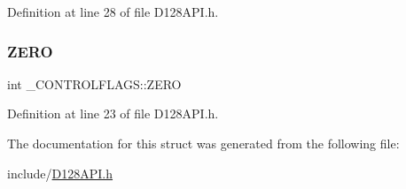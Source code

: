 Definition at line 28 of file D128\+A\+P\+I.\+h.

\mbox{\label{struct___c_o_n_t_r_o_l_f_l_a_g_s_aa7afe08fe584784481bb027e2312969f}} 
\subsubsection{\texorpdfstring{Z\+E\+RO}{ZERO}}
{\footnotesize\ttfamily int \+\_\+\+C\+O\+N\+T\+R\+O\+L\+F\+L\+A\+G\+S\+::\+Z\+E\+RO}



Definition at line 23 of file D128\+A\+P\+I.\+h.



The documentation for this struct was generated from the following file\+:\begin{DoxyCompactItemize}
\item 
include/\hyperlink{_d128_a_p_i_8h}{D128\+A\+P\+I.\+h}\end{DoxyCompactItemize}
